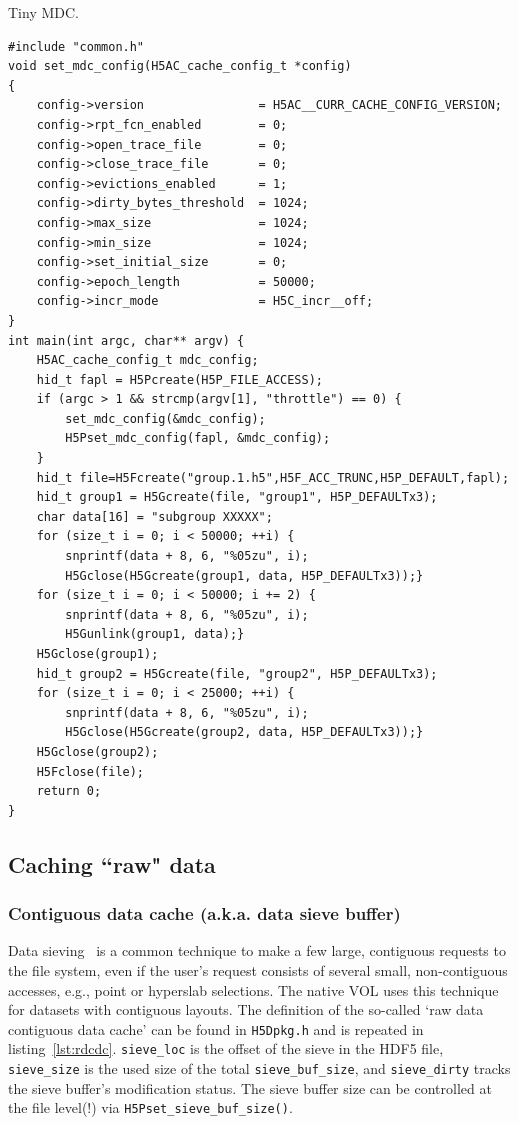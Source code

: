 \begin{listing}
\centering
\caption{Tiny MDC.}
\label{lst:no-mdc}
\begin{verbatim}
#include "common.h"
void set_mdc_config(H5AC_cache_config_t *config)
{
    config->version                = H5AC__CURR_CACHE_CONFIG_VERSION;
    config->rpt_fcn_enabled        = 0;
    config->open_trace_file        = 0;
    config->close_trace_file       = 0;
    config->evictions_enabled      = 1;
    config->dirty_bytes_threshold  = 1024;
    config->max_size               = 1024;
    config->min_size               = 1024;
    config->set_initial_size       = 0;
    config->epoch_length           = 50000;
    config->incr_mode              = H5C_incr__off;
}
int main(int argc, char** argv) {
    H5AC_cache_config_t mdc_config;
    hid_t fapl = H5Pcreate(H5P_FILE_ACCESS);
    if (argc > 1 && strcmp(argv[1], "throttle") == 0) {
        set_mdc_config(&mdc_config);
        H5Pset_mdc_config(fapl, &mdc_config);
    }
    hid_t file=H5Fcreate("group.1.h5",H5F_ACC_TRUNC,H5P_DEFAULT,fapl);
    hid_t group1 = H5Gcreate(file, "group1", H5P_DEFAULTx3);
    char data[16] = "subgroup XXXXX";
    for (size_t i = 0; i < 50000; ++i) {
        snprintf(data + 8, 6, "%05zu", i);
        H5Gclose(H5Gcreate(group1, data, H5P_DEFAULTx3));}
    for (size_t i = 0; i < 50000; i += 2) {
        snprintf(data + 8, 6, "%05zu", i);
        H5Gunlink(group1, data);}
    H5Gclose(group1);
    hid_t group2 = H5Gcreate(file, "group2", H5P_DEFAULTx3);
    for (size_t i = 0; i < 25000; ++i) {
        snprintf(data + 8, 6, "%05zu", i);
        H5Gclose(H5Gcreate(group2, data, H5P_DEFAULTx3));}
    H5Gclose(group2);
    H5Fclose(file);
    return 0;
}
\end{verbatim}
\end{listing}


\subsection{Caching ``raw" data}

\subsubsection{Contiguous data cache (a.k.a. data sieve buffer)}

Data sieving~\cite{thakur1999} is a common technique to make a few large, contiguous requests to the file system, even if the user’s request consists of several small, non-contiguous accesses, e.g., point or hyperslab selections. The native VOL uses this technique for datasets with contiguous layouts. The definition of the so-called `raw data contiguous data cache' can be found in \texttt{H5Dpkg.h} and is repeated in listing~\ref{lst:rdcdc}. \texttt{sieve\_loc} is the offset of the sieve in the HDF5 file, \texttt{sieve\_size} is the used size of the total \texttt{sieve\_buf\_size}, and \texttt{sieve\_dirty} tracks the sieve buffer's modification status. The sieve buffer size can be controlled at the file level(!) via \texttt{H5Pset\_sieve\_buf\_size()}.

